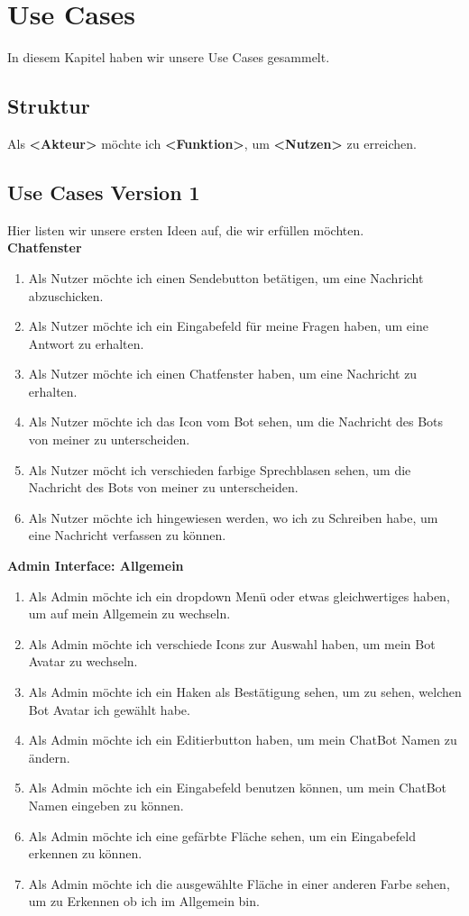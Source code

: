 \section{Use Cases}
In diesem Kapitel haben wir unsere Use Cases gesammelt.

\subsection{Struktur}
Als \textbf{<Akteur>} möchte ich \textbf{<Funktion>}, um \textbf{<Nutzen>} zu erreichen.
\subsection{Use Cases Version 1}
Hier listen wir unsere ersten Ideen auf, die wir erfüllen möchten.
\\

\textbf{Chatfenster}
\begin{enumerate}
    \item Als Nutzer möchte ich einen Sendebutton betätigen, um eine Nachricht abzuschicken. 
    \item Als Nutzer möchte ich ein Eingabefeld für meine Fragen haben, um eine Antwort zu erhalten.
    \item Als Nutzer möchte ich einen Chatfenster haben, um eine Nachricht zu erhalten. 
    \item Als Nutzer möchte ich das Icon vom Bot sehen, um die Nachricht des Bots von meiner zu unterscheiden. 
    \item Als Nutzer möcht ich verschieden farbige Sprechblasen sehen, um die Nachricht des Bots von meiner zu unterscheiden. 
    \item Als Nutzer möchte ich hingewiesen werden, wo ich zu Schreiben habe, um eine Nachricht verfassen zu können. 
\end{enumerate}

\textbf{Admin Interface: Allgemein}
\begin{enumerate}
    \item Als Admin möchte ich ein dropdown Menü oder etwas gleichwertiges haben, um auf mein Allgemein zu wechseln. 
    \item Als Admin möchte ich verschiede Icons zur Auswahl haben, um mein Bot Avatar zu wechseln. 
    \item Als Admin möchte ich ein Haken als Bestätigung sehen, um zu sehen, welchen Bot Avatar ich gewählt habe. 
    \item Als Admin möchte ich ein Editierbutton haben, um mein ChatBot Namen zu ändern. 
    \item Als Admin möchte ich ein Eingabefeld benutzen können, um mein ChatBot Namen eingeben zu können. 
    \item Als Admin möchte ich eine gefärbte Fläche sehen, um ein Eingabefeld erkennen zu können. 
    \item Als Admin möchte ich die ausgewählte Fläche in einer anderen Farbe sehen, um zu Erkennen ob ich im Allgemein bin. 
\end{enumerate}

